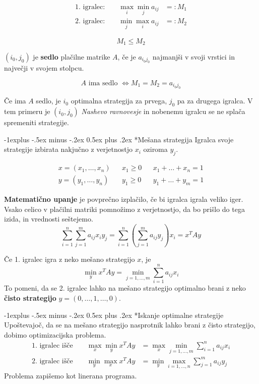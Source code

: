 \documentclass[a4paper,8pt]{extarticle}
\makeatletter
\renewcommand{\subsection}{\@startsection{subsection}{2}{0mm}%
                                {-1explus -.5ex minus -.2ex}%
                                {0.5ex plus .2ex}%
                                {\normalfont\normalsize\bfseries}}
\makeatother
\begin{document}
\begin{multicols}{4}
\begin{align*}
	\text{1. igralec: } && \max_i \min_j a_{ij} &=: M_1 \\
	\text{2. igralec: } && \min_j \max_i a_{ij} &=: M_2
\end{align*}

\[ M_1 \leq M_2\]

$(i_0, j_0)$ je \textbf{sedlo} plačilne matrike $A$, če je $a_{i_0 j_0}$ najmanjši v svoji vrstici in največji v svojem stolpcu.

\[ A \text{ ima sedlo } \iff M_1 = M_2 = a_{i_0 j_0}\]

Če ima $A$ sedlo, je $i_0$ optimalna strategija za prvega, $j_0$ pa za drugega igralca. V tem primeru je $(i_0, j_0)$ \emph{Nashevo ravnovesje} in nobenemu igralcu se ne splača spremeniti strategije.

\subsection*{Mešana strategija}
Igralca svoje strategije izbirata nakjučno z verjetnostjo $x_i$ oziroma $y_j$.

\begin{align*}
	x = (x_1, \dots, x_n) && x_1 \geq 0 && x_1 + \dots + x_n = 1 \\
	y = (y_1, \dots, y_n) && y_1 \geq 0 && y_1 + \dots + y_m = 1 
\end{align*}

\textbf{Matematično upanje} je povprečno izplačilo, če bi igralca igrala veliko iger. Vsako celico v plačilni matriki pomnožimo z verjetnostjo, da bo prišlo do tega izida, in vrednosti seštejemo.
\[ \sum_{i=1}^n \sum_{j=1}^m a_{ij} x_i y_j = \sum_{i=1}^n \left( \sum_{j=1}^m a_{ij} y_j \right) x_i = x^T A y\]

Če 1. igralec igra z neko mešano strategijo $x$, je
\[ \min_y x^T A y = \min_{j=1,\dots , m} \sum_{i=1}^n a_{ij} x_i\]
To pomeni, da se 2. igralec lahko na mešano strategijo optimalno brani z neko \textbf{čisto strategijo} $y = (0,\dots,1,\dots,0)$.

\subsection*{Iskanje optimalne strategije}
Upoštevajoč, da se na mešano strategijo nasprotnik lahko brani z čisto strategijo, dobimo optimizacijska problema.
\begin{align*}
	\text{1. igralec išče } && \max_x \min_y x^TAy &= \max_x \min_{j=1,\dots , m} \sum_{i=1}^n a_{ij} x_i\\
	\text{2. igralec išče } && \min_y \max_x x^TAy &= \min_y \max_{i=1,\dots , n} \sum_{j=1}^m a_{ij} y_j
\end{align*}
Problema zapišemo kot linerana programa.


\end{multicols}
\end{document}
